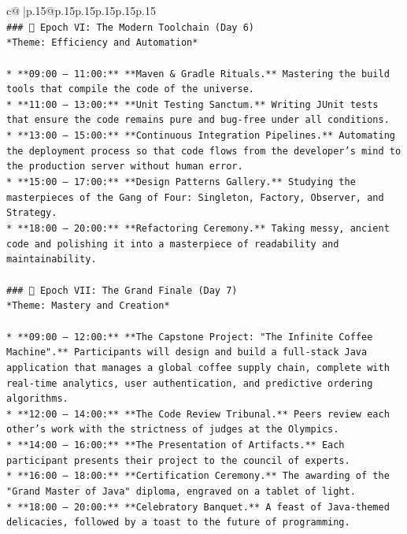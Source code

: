 \documentclass{article}
\begin{document}
{\begin{supertabular}{c@{$\;$}|p{.15\linewidth}@{}p{.15\linewidth}p{.15\linewidth}p{.15\linewidth}p{.15\linewidth}p{.15\linewidth}}
{{{\\ 
\texttt{\#\#\# 📅 Epoch VI: The Modern Toolchain (Day 6)} \\
\texttt{*Theme: Efficiency and Automation*} \\
\\ 
\texttt{*   **09:00 – 11:00:** **Maven \& Gradle Rituals.** Mastering the build tools that compile the code of the universe.} \\
\texttt{*   **11:00 – 13:00:** **Unit Testing Sanctum.** Writing JUnit tests that ensure the code remains pure and bug{-}free under all conditions.} \\
\texttt{*   **13:00 – 15:00:** **Continuous Integration Pipelines.** Automating the deployment process so that code flows from the developer's mind to the production server without human error.} \\
\texttt{*   **15:00 – 17:00:** **Design Patterns Gallery.** Studying the masterpieces of the Gang of Four: Singleton, Factory, Observer, and Strategy.} \\
\texttt{*   **18:00 – 20:00:** **Refactoring Ceremony.** Taking messy, ancient code and polishing it into a masterpiece of readability and maintainability.} \\
\\ 
\texttt{\#\#\# 📅 Epoch VII: The Grand Finale (Day 7)} \\
\texttt{*Theme: Mastery and Creation*} \\
\\ 
\texttt{*   **09:00 – 12:00:** **The Capstone Project: "The Infinite Coffee Machine".** Participants will design and build a full{-}stack Java application that manages a global coffee supply chain, complete with real{-}time analytics, user authentication, and predictive ordering algorithms.} \\
\texttt{*   **12:00 – 14:00:** **The Code Review Tribunal.** Peers review each other's work with the strictness of judges at the Olympics.} \\
\texttt{*   **14:00 – 16:00:** **The Presentation of Artifacts.** Each participant presents their project to the council of experts.} \\
\texttt{*   **16:00 – 18:00:** **Certification Ceremony.** The awarding of the "Grand Master of Java" diploma, engraved on a tablet of light.} \\
\texttt{*   **18:00 – 20:00:** **Celebratory Banquet.** A feast of Java{-}themed delicacies, followed by a toast to the future of programming.} \\
}}}
\end{supertabular}}
\end{document}
